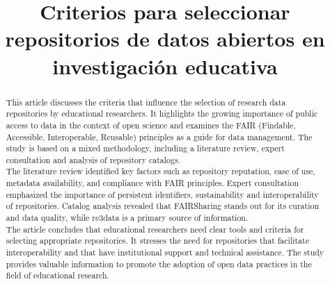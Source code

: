 \documentclass{article}
\title{Criterios para seleccionar repositorios de datos abiertos en investigación educativa}
\begin{document}
\maketitle

\begin{abstract}
This article discusses the criteria that influence the selection of research data repositories by educational researchers. It highlights the growing importance of public access to data in the context of open science and examines the FAIR (Findable, Accessible, Interoperable, Reusable) principles as a guide for data management. The study is based on a mixed methodology, including a literature review, expert consultation and analysis of repository catalogs.\\

The literature review identified key factors such as repository reputation, ease of use, metadata availability, and compliance with FAIR principles. Expert consultation emphasized the importance of persistent identifiers, sustainability and interoperability of repositories. Catalog analysis revealed that FAIRSharing stands out for its curation and data quality, while re3data is a primary source of information.\\

The article concludes that educational researchers need clear tools and criteria for selecting appropriate repositories. It stresses the need for repositories that facilitate interoperability and that have institutional support and technical assistance. The study provides valuable information to promote the adoption of open data practices in the field of educational research.\\
\end{abstract}
\end{document}
